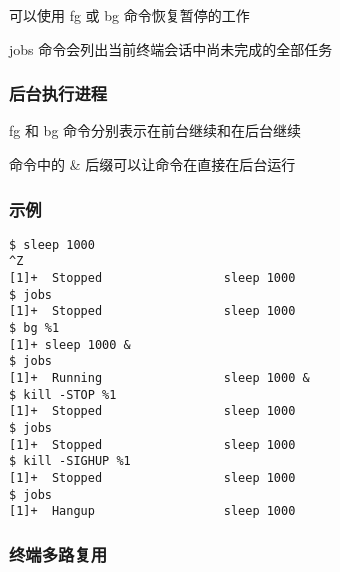 \documentclass[a4paper,12pt]{ctexart}
\begin{document}
可以使用 fg 或 bg 命令恢复暂停的工作

jobs 命令会列出当前终端会话中尚未完成的全部任务

\subsubsection{后台执行进程}
 fg 和 bg 命令分别表示在前台继续和在后台继续

命令中的 \& 后缀可以让命令在直接在后台运行


\subsubsection{示例}
\begin{lstlisting}
$ sleep 1000
^Z
[1]+  Stopped                 sleep 1000
$ jobs
[1]+  Stopped                 sleep 1000
$ bg %1
[1]+ sleep 1000 &
$ jobs
[1]+  Running                 sleep 1000 &
$ kill -STOP %1
[1]+  Stopped                 sleep 1000
$ jobs
[1]+  Stopped                 sleep 1000
$ kill -SIGHUP %1
[1]+  Stopped                 sleep 1000
$ jobs
[1]+  Hangup                  sleep 1000
\end{lstlisting}

\subsubsection{终端多路复用}
\end{document}
